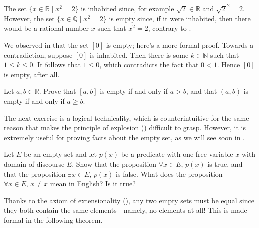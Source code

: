 \begin{example}
The set $\{ x \in \mathbb{R} \mid x^2 = 2 \}$ is inhabited since, for example $\sqrt{2} \in \mathbb{R}$ and $\sqrt{2}^2 = 2$. However, the set $\{ x \in \mathbb{Q} \mid x^2 = 2 \}$ is empty since, if it were inhabited, then there would be a rational number $x$ such that $x^2 = 2$, contrary to .
\end{example}

\begin{example}
We observed in  that the set $[0]$ is empty; here's a more formal proof. Towards a contradiction, suppose $[0]$ is inhabited. Then there is some $k \in \mathbb{N}$ such that $1 \le k \le 0$. It follows that $1 \le 0$, which contradicts the fact that $0<1$. Hence $[0]$ is empty, after all.
\end{example}

\begin{exercise}
Let $a,b \in \mathbb{R}$. Prove that $[a,b]$ is empty if and only if $a > b$, and that $(a,b)$ is empty if and only if $a \ge b$.
\end{exercise}

The next exercise is a logical technicality, which is counterintuitive for the same reason that makes the principle of explosion () difficult to grasp. However, it is extremely useful for proving facts about the empty set, as we will see soon in .

\begin{exercise}
Let $E$ be an empty set and let $p(x)$ be a predicate with one free variable $x$ with domain of discourse $E$. Show that the proposition $\forall x \in E,\, p(x)$ is true, and that the proposition $\exists x \in E,\, p(x)$ is false. What does the proposition $\forall x \in E,\, x \ne x$ mean in English? Is it true?
\end{exercise}

Thanks to the axiom of extensionality (), any two empty sets must be equal since they both contain the same elements---namely, no elements at all! This is made formal in the following theorem.

